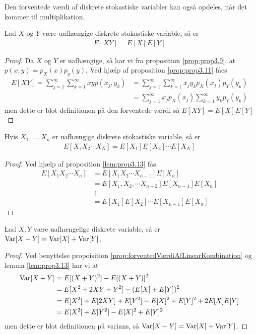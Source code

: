 Den forventede værdi af diskrete stokastiske variabler kan også opdeles, når det kommer til multiplikation.  
\begin{lem} \label{lem:prop3.13} %
    Lad $X$ og $Y$ være uafhængige diskrete stokastiske variable, så er 
    \begin{align*}
        E[XY]=E[X]E[Y]
    \end{align*}
\end{lem}
\begin{proof}
    Da $X$ og $Y$ er uafhængige, så har vi fra proposition \ref{prop:prop3.9}, at $p(x,y)=p_X(x)p_y(y)$. Ved hjælp af proposition \ref{prop:prop3.11} fåes
    \begin{align*}
        E[XY]=\sum_{j=1}^\infty\sum_{k=1}^\infty xyp(x_j,y_k)&=\sum_{j=1}^\infty\sum_{k=1}^\infty x_jy_kp_X(x_j)p_Y(y_k)\\ &=\sum_{j=1}^\infty x_jp_X(x_j)\sum_{k=1}^\infty y_kp_Y(y_k)
    \end{align*}
    men dette er blot definitionen på den forventede værdi så $E[XY] = E[X]E[Y]$
\end{proof}

\begin{prop} \label{prop:prop3.15} %
    Hvis $X_1,\ldots, X_n$ er uafhængige diskrete stokastiske variable, så er
\begin{align*}
    E[X_1X_2\cdots X_N]=E[X_1]E[X_2]\cdots E[X_N]
\end{align*}
\end{prop}
\begin{proof}
Ved hjælp af proposition \ref{lem:prop3.13} fås
    \begin{align*}
        E[X_1X_2\cdots X_n]
        &=E[X_1X_2\cdots X_{n-1}]E[X_n]
        \\
        &=E[X_1,X_2,\cdots X_{n-2}]E[X_{n-1}]E[X_n]\\
        &\; \vdots \\
        &=E[X_1]E[X_2]\cdots E[X_{n-1}]E[X_n]
    \end{align*}
\end{proof}

\begin{prop}\label{prop:variansAfX+Y}
Lad $X, Y$ være uafhængelige diskrete variable, så er $\textnormal{Var}[X + Y] = \textnormal{Var}[X] + \textnormal{Var}[Y]$.
\end{prop}
\begin{proof}
  Ved benyttelse propoisition \ref{prop:forventedVærdiAfLinearKombination} og lemma \ref{lem:prop3.13} har vi at
  \begin{align*}
    \textnormal{Var}[X + Y] &= E[(X + Y)^{2}] - E[(X + Y)]^{2} \\
                &= E[X^{2} + 2XY + Y^{2}] - (E[X] + E[Y])^{2} \\
                &= E[X^{2}] + E[2XY] + E[Y^{2}] - E[X]^{2} + E[Y]^{2} + 2E[X]E[Y]\\
                &= E[X^{2}] + E[Y^{2}] - E[X]^{2} + E[Y]^{2}
  \end{align*}
  men dette er blot definitionen på varians, så $\textnormal{Var}[X + Y] = \textnormal{Var}[X] + \textnormal{Var}[Y]$.
\end{proof}


